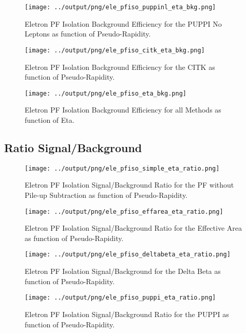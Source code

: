 \documentclass[11pt]{book}
\begin{document}
\begin{figure}[htb]
\centering
\texttt{[image: ../output/png/ele\_pfiso\_puppinl\_eta\_bkg.png]}
\caption{Eletron PF Isolation Background Efficiency for the PUPPI No Leptons as function of Pseudo-Rapidity.}
\label{fig:ele_pfiso_eta_bkg_puppinl}
\end{figure}

\begin{figure}[htb]
\centering
\texttt{[image: ../output/png/ele\_pfiso\_citk\_eta\_bkg.png]}
\caption{Eletron PF Isolation Background Efficiency for the CITK as function of Pseudo-Rapidity.}
\label{fig:ele_pfiso_eta_bkg_citk}
\end{figure}

\begin{figure}[htb]
\centering
\texttt{[image: ../output/png/ele\_pfiso\_eta\_bkg.png]}
\caption{Eletron PF Isolation Background Efficiency for all Methods as function of Eta.}
\label{fig:ele_pfiso_eta_bkg}
\end{figure}
\clearpage

\subsection{Ratio Signal/Background}
\begin{figure}[htb]
\centering
\texttt{[image: ../output/png/ele\_pfiso\_simple\_eta\_ratio.png]}
\caption{Eletron PF Isolation Signal/Background Ratio for the PF without Pile-up Subtraction as function of Pseudo-Rapidity.}
\label{fig:ele_pfiso_eta_ratio_simple}
\end{figure}


\begin{figure}[htb]
\centering
\texttt{[image: ../output/png/ele\_pfiso\_effarea\_eta\_ratio.png]}
\caption{Eletron PF Isolation Signal/Background Ratio for the Effective Area as function of Pseudo-Rapidity.}
\label{fig:ele_pfiso_eta_ratio_effarea}
\end{figure}

\begin{figure}[htb]
\centering
\texttt{[image: ../output/png/ele\_pfiso\_deltabeta\_eta\_ratio.png]}
\caption{Eletron PF Isolation Signal/Background for the Delta Beta as function of Pseudo-Rapidity.}
\label{fig:ele_pfiso_eta_ratio_deltabeta}
\end{figure}

\begin{figure}[htb]
\centering
\texttt{[image: ../output/png/ele\_pfiso\_puppi\_eta\_ratio.png]}
\caption{Eletron PF Isolation Signal/Background Ratio for the PUPPI as function of Pseudo-Rapidity.}
\label{fig:ele_pfiso_eta_ratio_puppi}
\end{figure}
\end{document}
